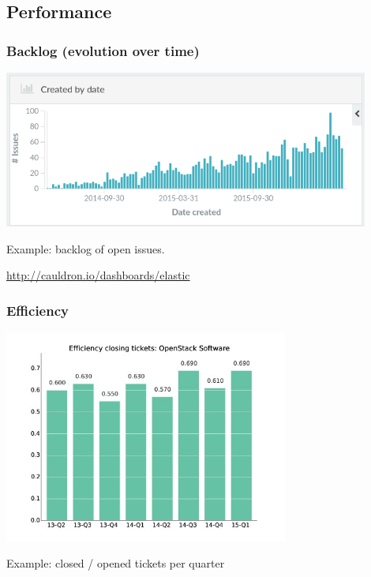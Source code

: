 \documentclass[17pt,aspectratio=169,hyperref=pdfusetitle]{beamer}
\begin{document}
\subsection{Performance}


\begin{frame}
\frametitle{Backlog (evolution over time)}

\begin{center}
  \includegraphics[width=12cm]{figs/backlog-issues-elastic}
\end{center}

Example: backlog of open issues.

\begin{flushright}
  \url{http://cauldron.io/dashboards/elastic}
\end{flushright}

\end{frame}



\begin{frame}
\frametitle{Efficiency}

\begin{center}
  \includegraphics[height=7cm]{figs/bmiOpenStackSoftware}
\end{center}

Example: closed / opened tickets per quarter

\end{frame}
\end{document}
